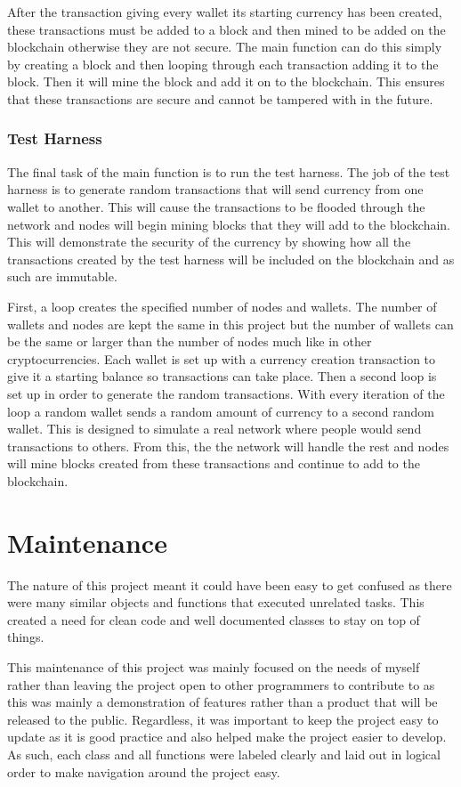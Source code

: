 \documentclass{l4proj}
\begin{document}
After the transaction giving every wallet its starting currency has been created, these transactions must be
added to a block and then mined to be added on the blockchain otherwise they are not secure. The main function
can do this simply by creating a block and then looping through each transaction adding it to the block. Then it will
mine the block and add it on to the blockchain. This ensures that these transactions are secure and cannot be tampered
with in the future.

\subsubsection{Test Harness}
The final task of the main function is to run the test harness. The job of the test harness is to generate 
random transactions that will send currency from one wallet to another. This will cause the transactions to 
be flooded through the network and nodes will begin mining blocks that they will add to the blockchain. This will
demonstrate the security of the currency by showing how all the transactions created by the test harness will
be included on the blockchain and as such are immutable.

First, a loop creates the specified number of nodes and wallets. The number of wallets and nodes are kept the same
in this project but the number of wallets can be the same or larger than the number of nodes much like in other cryptocurrencies. 
Each wallet is set up with a currency
creation transaction to give it a starting balance so transactions can take place. Then a second loop is set up
in order to generate the random transactions. With every iteration of the loop a random wallet sends a random amount
of currency to a second random wallet. This is designed to simulate a real network where people would send
transactions to others. From this, the the network will handle the rest and nodes will mine blocks created from these
transactions and continue to add to the blockchain.

\section{Maintenance}
The nature of this project meant it could have been easy to get confused as there were many similar objects and functions 
that executed unrelated tasks. This created a need for clean code and well documented classes to stay on top 
of things.

This maintenance of this project was mainly focused on the needs of myself rather than leaving the project open
to other programmers to contribute to as this was mainly a demonstration of features rather than a product that will
be released to the public. Regardless, it was important to keep the project easy to update as it is good practice
and also helped make the project easier to develop. As such, each class and all functions were labeled clearly
and laid out in logical order to make navigation around the project easy.
\end{document}
